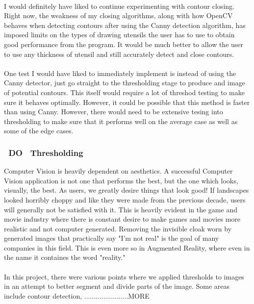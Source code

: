 \documentclass[11pt]{article}
\begin{document}
\\
I would definitely have liked to continue experimenting with contour closing.
Right now, the weakness of my closing algorithms, along with how OpenCV
behaves when detecting contours after using the Canny detection algorithm, 
has imposed limits on the types of drawing utensils the user has to use to
obtain good performance from the program. It would be much
better to allow the user to use any thickness of utensil and still 
accurately detect and close contours.\\
\\
One test I would have liked to immediately implement is instead of using
the Canny detector, just go straight to the thresholding stage to produce
and image of potential contours. This itself would require a lot of
threshod testing to make sure it behaves optimally. However, it could be
possible that this method is faster than using Canny. However,
there would need to be extensive tesing into thresholding to make sure that
it performs well on the average case as well as some of the edge cases.

\subsubsection{~DO~ Thresholding}
Computer Vision is heavily dependent on aesthetics. A successful Computer
Vision application is not one that performs the best, but the one which looks,
visually, the best. As users, we greatly desire things that look good! If
landscapes looked horribly choppy and like they were made from the previous 
decade, users will generally not be satisfied with it. This is heavily evident
in the game and movie industry where there is constant desire to make games
and movies more realistic and not computer generated. Removing the invisible 
cloak worn by generated images that practically say "I'm not real" is the
goal of many companies in this field. This is even more so in  Augmented Reality,
where even in the name it containes the word "reality." \\
\\
In this project, there were various points where we applied thresholds to images
in an attempt to better segment and divide parts of the image. Some areas include
contour detection, 
.......................MORE
\end{document}
